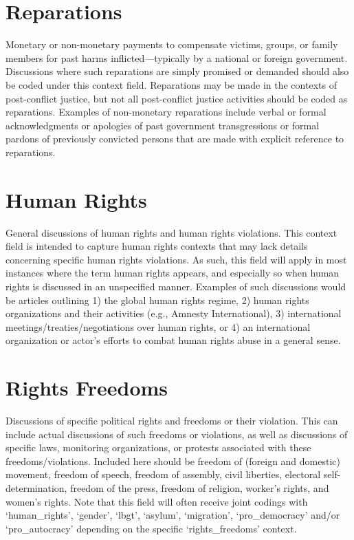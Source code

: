 \documentclass[11pt]{report}
\begin{document}
\section{Reparations}\label{context:reparations}

Monetary or non-monetary payments to compensate victims, groups, or family members for past harms inflicted---typically by a national or foreign government. Discussions where such reparations are simply promised or demanded should also be coded under this context field. Reparations may be made in the contexts of post-conflict justice, but not all post-conflict justice activities should be coded as reparations. Examples of non-monetary reparations include verbal or formal acknowledgments or apologies of past government transgressions or formal pardons of previously convicted persons that are made with explicit reference to reparations.



\section{Human Rights}\label{context:hr}

General discussions of human rights and human rights violations. This context field is intended to capture human rights contexts that may lack details concerning specific human rights violations. As such, this field will apply in most instances where the term human rights appears, and especially so when human rights is discussed in an unspecified manner. Examples of such discussions would be articles outlining 1) the global human rights regime, 2) human rights organizations and their activities (e.g., Amnesty International), 3) international meetings/treaties/negotiations over human rights, or 4) an international organization or actor's efforts to combat human rights abuse in a general sense.

\section{Rights Freedoms}\label{context:rightsfree}

Discussions of specific political rights and freedoms or their violation. This can include actual discussions of such freedoms or violations, as well as discussions of specific laws, monitoring organizations, or protests associated with these freedoms/violations. Included here should be freedom of (foreign and domestic) movement, freedom of speech, freedom of assembly, civil liberties, electoral self-determination, freedom of the press, freedom of religion, worker's rights, and women's rights. Note that this field will often receive joint codings with `human\_rights', `gender', `lbgt', `asylum', `migration', `pro\_democracy' and/or `pro\_autocracy' depending on the specific `rights\_freedoms' context.
\end{document}
